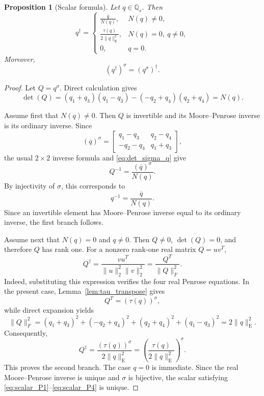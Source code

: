 \documentclass[12pt,a4paper]{article}
\theoremstyle{plain}
\newtheorem{proposition}[theorem]{Proposition}
\theoremstyle{definition}
\theoremstyle{remark}
\begin{document}
\begin{proposition}[Scalar formula] \label{prop:scalar_mp}
Let \(q\in\mathbb{Q}_s\). Then
\begin{equation}\label{mp:sq}
    q^\dagger=
    \begin{cases}
    \displaystyle \frac{\overline q}{N(q)},
    & N(q)\neq0,\\[8pt]
    \displaystyle \frac{\tau(q)}{2\|q\|_{\mathrm E}^2},
    & N(q)=0,\ q\neq0,\\[8pt]
    0,&q=0.
    \end{cases}
\end{equation}
Moreover,
\[
    (q^\dagger)^\sigma=(q^\sigma)^\dagger.
\]
\end{proposition}

\begin{proof}
Let \(Q=q^\sigma\). Direct calculation gives
\begin{equation}\label{eq:det_sigma_q}
    \det(Q) =(q_1+q_3)(q_1-q_3)-(-q_2+q_4)(q_2+q_4) =N(q).
\end{equation}

Assume first that \(N(q)\neq0\). Then \(Q\) is invertible and its Moore--Penrose inverse is its ordinary inverse. Since
\[
    (\overline q)^\sigma =
    \begin{bmatrix}
    q_1-q_3&q_2-q_4\\
    -q_2-q_4&q_1+q_3
    \end{bmatrix},
\]
the usual \(2\times2\) inverse formula and \eqref{eq:det_sigma_q} give
\[
    Q^{-1}=\frac{(\overline q)^\sigma}{N(q)}.
\]
By injectivity of \(\sigma\), this corresponds to
\[
    q^{-1}=\frac{\overline q}{N(q)}.
\]
Since an invertible element has Moore--Penrose inverse equal to its ordinary inverse, the first branch follows.

Assume next that \(N(q)=0\) and \(q\neq0\). Then \(Q\neq0\), \(\det(Q)=0\), and therefore \(Q\) has rank one. For a nonzero rank-one real matrix \(Q=uv^T\),
\[
    Q^\dagger =\frac{vu^T}{\|u\|_2^2\|v\|_2^2} =\frac{Q^T}{\|Q\|_F^2}.
\]
Indeed, substituting this expression verifies the four real Penrose equations. In the present case, Lemma~\ref{lem:tau_transpose} gives
\[
    Q^T=(\tau(q))^\sigma,
\]
while direct expansion yields
\[
    \|Q\|_F^2 =(q_1+q_3)^2+(-q_2+q_4)^2+(q_2+q_4)^2+(q_1-q_3)^2 =2\|q\|_{\mathrm E}^2.
\]
Consequently,
\[
    Q^\dagger =\frac{(\tau(q))^\sigma}{2\|q\|_{\mathrm E}^2} =\left(\frac{\tau(q)}{2\|q\|_{\mathrm E}^2}\right)^\sigma.
\]
This proves the second branch. The case \(q=0\) is immediate. Since the real Moore--Penrose inverse is unique and \(\sigma\) is bijective, the scalar satisfying \eqref{eq:scalar_P1}--\eqref{eq:scalar_P4} is unique.
\end{proof}
\end{document}
